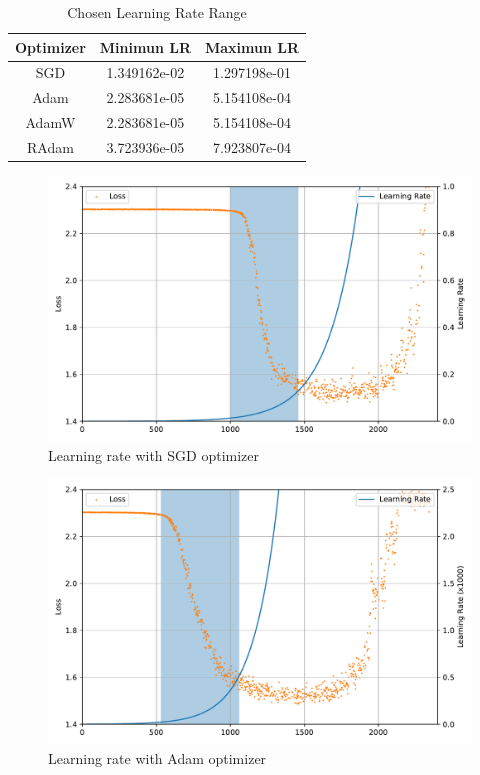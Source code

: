 \documentclass{article}
\begin{document}
\begin{table}[ht!]
    \centering
    \caption{Chosen Learning Rate Range}\label{tab:lr_range}
    \begin{tabular}{ccc}
        \toprule
        Optimizer & Minimun LR   & Maximun LR   \\
        \midrule
        SGD       & 1.349162e-02 & 1.297198e-01 \\
        Adam      & 2.283681e-05 & 5.154108e-04 \\
        AdamW     & 2.283681e-05 & 5.154108e-04 \\
        RAdam     & 3.723936e-05 & 7.923807e-04 \\
        \bottomrule
    \end{tabular}
\end{table}

\begin{figure}[ht!]
    \centering
    \includegraphics[scale=0.64]{images/lr_range_sgd.pdf}
    \caption{Learning rate with SGD optimizer}\label{fig:lr_range_sgd}
\end{figure}

\begin{figure}[ht!]
    \centering
    \includegraphics[scale=0.64]{images/lr_range_adam.pdf}
    \caption{Learning rate with Adam optimizer}\label{fig:lr_range_adam}
\end{figure}
\end{document}
